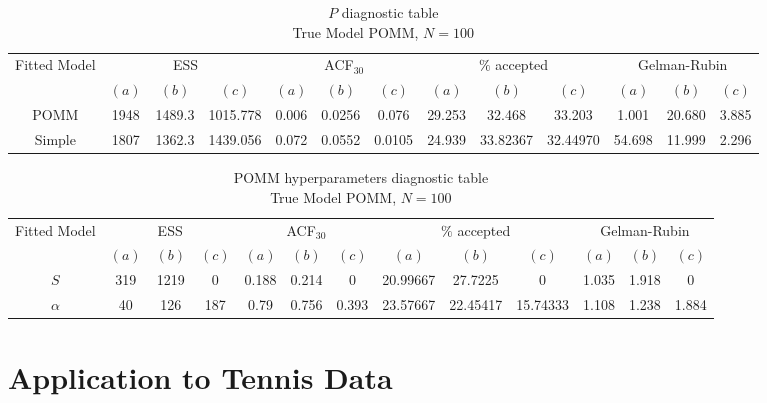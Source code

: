\documentclass[11pt]{amsart}
\begin{document}
\begin{table}[htbp]
\centering
\caption*{
{\large $P$ diagnostic table} \\ 
{\small True Model POMM, $N=100$}
} 
\begin{tabular}{ccccccccccccc}
\toprule
\multirow{2}{*}{Fitted Model} & \multicolumn{3}{c}{ESS} & \multicolumn{3}{c}{
ACF$_{30}$} & \multicolumn{3}{c}{$\%$ accepted} & \multicolumn{3}{c}{Gelman-Rubin}\\
\cmidrule(lr){2-4} \cmidrule(lr){5-7} \cmidrule(lr){8-10} \cmidrule(lr){11-13} 
& $(a)$ & $(b)$ & $(c)$ & $(a)$ & $(b)$ & $(c)$ & $(a)$ & $(b)$ & $(c)$ & $(a)$ & $(b)$ & $(c)$ \\
\midrule
POMM &1948 & 1489.3 & 1015.778 & 0.006& 0.0256 & 0.076 & 29.253 & 32.468 & 33.203& 1.001 & 20.680 & 3.885   \\
Simple &1807 & 1362.3 & 1439.056 & 0.072& 0.0552 & 0.0105&24.939 & 33.82367 & 32.44970& 54.698 & 11.999 & 2.296  \\
\bottomrule
\end{tabular}
\label{table:simulations_from_simple}
\end{table}


\begin{table}[htbp]
\centering
\caption*{
{\large POMM hyperparameters diagnostic table} \\ 
{\small True Model POMM, $N=100$}
} 
\begin{tabular}{ccccccccccccc}
\toprule
\multirow{2}{*}{Fitted Model} & \multicolumn{3}{c}{ESS} & \multicolumn{3}{c}{
ACF$_{30}$} & \multicolumn{3}{c}{$\%$ accepted} & \multicolumn{3}{c}{Gelman-Rubin}\\
\cmidrule(lr){2-4} \cmidrule(lr){5-7} \cmidrule(lr){8-10} \cmidrule(lr){11-13} 
& $(a)$ & $(b)$ & $(c)$ & $(a)$ & $(b)$ & $(c)$ & $(a)$ & $(b)$ & $(c)$ & $(a)$ & $(b)$ & $(c)$ \\
\midrule
$S$ &319 & 1219 & 0 & 0.188 & 0.214 & 0 & 20.99667 & 27.7225 & 0 & 1.035 & 1.918 & 0 \\
$\alpha$ &40 & 126 & 187 & 0.79 & 0.756 & 0.393 & 23.57667 & 22.45417 & 15.74333 & 1.108 & 1.238 & 1.884   \\
\bottomrule
\end{tabular}
\label{table:simulations_from_simple}
\end{table}






\clearpage

\section{Application to Tennis Data}
\end{document}
